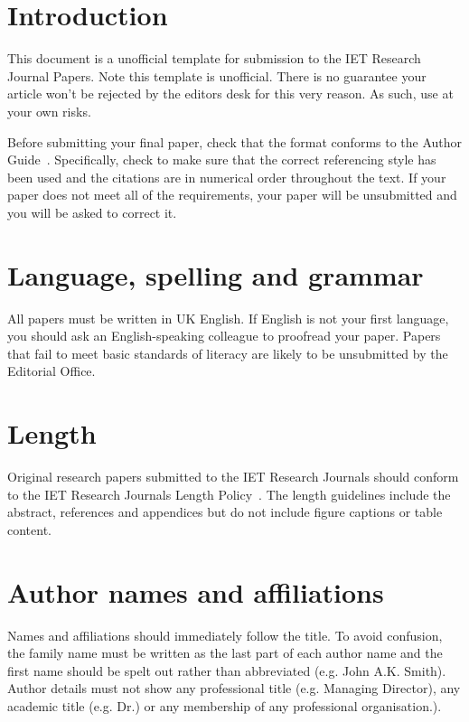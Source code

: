 \documentclass{ietperso}
\begin{document}
\begin{ietbody}
\section{Introduction}
This document is a unofficial template for submission to the IET Research Journal Papers. Note this template is unofficial. There is no guarantee your article won't be rejected by the editors desk for this very reason. As such, use at your own risks.

Before submitting your final paper, check that the format conforms to the Author Guide~\cite{author_2015_guide}.  Specifically, check to make sure that the correct referencing style has been used and the citations are in numerical order throughout the text. If your paper does not meet all of the requirements, your paper will be unsubmitted and you will be asked to correct it.

\section{Language, spelling and grammar}
All papers must be written in UK English. If English is not your first language, you should ask an English-speaking colleague to proofread your paper. Papers that fail to meet basic standards of literacy are likely to be unsubmitted by the Editorial Office.

\section{Length}
Original research papers submitted to the IET Research Journals should conform to the IET Research Journals Length Policy~\cite{author_2015_length}. The length guidelines include the abstract, references and appendices but do not include figure captions or table content.

\section{Author names and affiliations}
Names and affiliations should immediately follow the title. To avoid confusion, the family name must be written as the last part of each author name and the first name should be spelt out rather than abbreviated (e.g. John A.K. Smith). Author details must not show any professional title (e.g. Managing Director), any academic title (e.g. Dr.) or any membership of any professional organisation.).


\end{ietbody}
\end{document}
